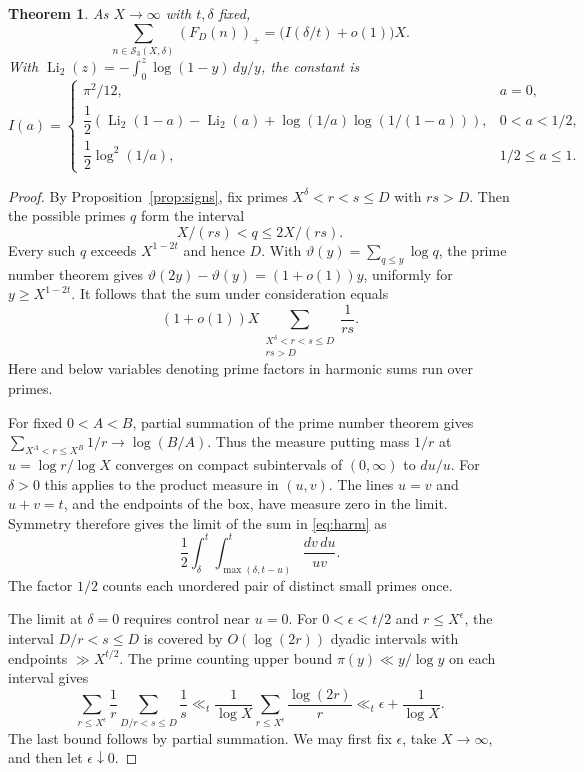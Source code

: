 \documentclass[11pt]{article}
\newcommand{\LiTwo}{\operatorname{Li}_2}
\newcommand{\pos}[1]{(#1)_{+}}
\newtheorem{theorem}{Theorem}
\begin{document}
\begin{theorem}\label{thm:positive}
As \(X\to\infty\) with \(t,\delta\) fixed,
\[
 \sum_{n\in\mathcal S_3(X,\delta)}\pos{F_D(n)}
   =\bigl(I(\delta/t)+o(1)\bigr)X .
\]
With \(\LiTwo(z)=-\int_0^z\log(1-y)\,dy/y\), the constant is
\begin{equation}\label{eq:constant}
 I(a)=
 \begin{cases}
 \pi^2/12, & a=0,\\[2pt]
 \dfrac12\left(\LiTwo(1-a)-\LiTwo(a)
 +\log(1/a)\log(1/(1-a))\right), &0<a<1/2,\\[3pt]
 \dfrac12\log^2(1/a),&1/2\le a\le 1 .
 \end{cases}
\end{equation}
\end{theorem}
\begin{proof}
By Proposition~\ref{prop:signs}, fix primes \(X^\delta<r<s\le D\)
with \(rs>D\). Then the possible primes \(q\) form the interval
\[
                  X/(rs)<q\le 2X/(rs).
\]
Every such \(q\) exceeds \(X^{1-2t}\) and hence \(D\). With
\(\vartheta(y)=\sum_{q\le y}\log q\), the prime number theorem gives
\(\vartheta(2y)-\vartheta(y)=(1+o(1))y\), uniformly for
\(y\ge X^{1-2t}\). It follows that the sum under consideration equals
\begin{equation}\label{eq:harm}
  (1+o(1))X
  \sum_{\substack{X^\delta<r<s\le D\\rs>D}}\frac{1}{rs}.
\end{equation}
Here and below variables denoting prime factors in harmonic sums run
over primes.

For fixed \(0<A<B\), partial summation of the prime number theorem
gives \(\sum_{X^A<r\le X^B}1/r\to\log(B/A)\). Thus the measure
putting mass \(1/r\) at \(u=\log r/\log X\) converges on compact
subintervals of \((0,\infty)\) to \(du/u\). For \(\delta>0\) this
applies to the product measure in \((u,v)\). The lines \(u=v\) and
\(u+v=t\), and the endpoints of the box, have measure zero in the
limit. Symmetry therefore gives the limit of the sum in \eqref{eq:harm}
as
\begin{equation}\label{eq:double}
 \frac12\int_{\delta}^{t}\int_{\max(\delta,t-u)}^{t}
                                     \frac{dv\,du}{uv}.
\end{equation}
The factor \(1/2\) counts each unordered pair of distinct small primes
once.

The limit at \(\delta=0\) requires control near \(u=0\).
For \(0<\epsilon<t/2\) and \(r\le X^\epsilon\),
the interval \(D/r<s\le D\) is covered by \(O(\log(2r))\) dyadic
intervals with endpoints \(\gg X^{t/2}\). The prime counting upper
bound \(\pi(y)\ll y/\log y\) on each interval gives
\[
 \sum_{r\le X^\epsilon}\frac1r
   \sum_{D/r<s\le D}\frac1s
 \ll_t \frac1{\log X}\sum_{r\le X^\epsilon}\frac{\log(2r)}r
 \ll_t \epsilon+\frac1{\log X}.
\]
The last bound follows by partial summation. We may first fix
\(\epsilon\), take \(X\to\infty\), and then let \(\epsilon\downarrow0\).


\end{proof}
\end{document}
